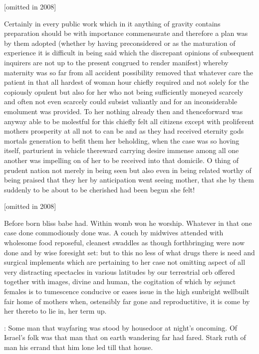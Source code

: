 \documentclass[12pt]{article}
\begin{document}
[omitted in 2008]

Certainly in every public work which in it anything of gravity contains
preparation should be with importance commensurate and therefore a plan
was by them adopted (whether by having preconsidered or as the
maturation of experience it is difficult in being said which the
discrepant opinions of subsequent inquirers are not up to the present
congrued to render manifest) whereby maternity was so far from all
accident possibility removed that whatever care the patient in that all
hardest of woman hour chiefly required and not solely for the copiously
opulent but also for her who not being sufficiently moneyed scarcely and
often not even scarcely could subsist valiantly and for an
inconsiderable emolument was provided. To her nothing already then and
thenceforward was anyway able to be molestful for this chiefly felt all
citizens except with proliferent mothers prosperity at all not to can be
and as they had received eternity gods mortals generation to befit them
her beholding, when the case was so hoving itself, parturient in vehicle
thereward carrying desire immense among all one another was impelling on
of her to be received into that domicile. O thing of prudent nation not
merely in being seen but also even in being related worthy of being
praised that they her by anticipation went seeing mother, that she by
them suddenly to be about to be cherished had been begun she felt!



[omitted in 2008]

Before born bliss babe had. Within womb won he worship. Whatever
in that one case done commodiously done was. A couch by midwives
attended with wholesome food reposeful, cleanest swaddles as though
forthbringing were now done and by wise foresight set: but to this no less
of what drugs there is need and surgical implements which are pertaining
to her case not omitting aspect of all very distracting spectacles in
various latitudes by our terrestrial orb offered together with images,
divine and human, the cogitation of which by sejunct females is to
tumescence conducive or eases issue in the high sunbright wellbuilt fair
home of mothers when, ostensibly far gone and reproductitive, it is come
by her thereto to lie in, her term up.



: Some man that wayfaring was stood by housedoor at night's
oncoming. Of Israel's folk was that man that on earth wandering far had
fared. Stark ruth of man his errand that him lone led till that house.
\end{document}
